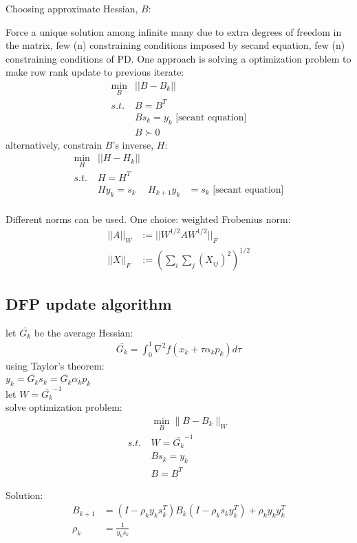\documentclass[8pt,letter]{article}
\begin{document}
\begin{multicols*}{2}
  Choosing approximate Hessian, $B$:
  
  Force a unique solution among infinite many due to extra degrees of freedom in the matrix, few (n) constraining conditions imposed by secand equation, few (n) constraining conditions of PD. One approach is solving a optimization problem to make row rank update to previous iterate:
  \begin{align*}
    \min_B & ||B-B_k||\\
    s.t.\ &B=B^T \\
    &Bs_k=y_k \text{ [secant equation]}\\
    &B \succ 0
  \end{align*}
  alternatively, constrain $B$'s inverse, $H$:
  \begin{align*}
    \min_H & ||H-H_k||\\
    s.t.\ &H=H^T\\
    &Hy_k=s_k
    &H_{k+1}y_k & = s_k \text{ [secant equation]}\\
  \end{align*}
  
  Different norms can be used. One choice: weighted Frobenius norm:
  \begin{align*}
    ||A||_W & := ||W^{1/2}AW^{1/2}||_F\\
    ||X||_F & := (\sum_i \sum_j (X_{ij})^2)^{1/2}
  \end{align*}

  \subsection{DFP update algorithm}
  let $\bar{G_k}$ be the average Hessian:
  \begin{align*}
    \bar{G_k} = \int_0^1 \nabla^2 f(x_k + \tau \alpha_k p_k) d \tau
  \end{align*}
  using Taylor's theorem:\\
  $y_k = \bar{G_k} s_k = \bar{G_k} \alpha_k p_k$\\
  let $W=\bar{G_k}^{-1}$\\
  solve optimization problem:
  \begin{align*}
    &\min_B \| B - B_k \|_W\\
    s.t.\ &W=\bar{G_k}^{-1}\\
    &Bs_k=y_k\\
    &B=B^T
  \end{align*}
  
  Solution:
  \begin{align*}
    B_{k+1} &= (I-\rho_k y_k s_k^T)B_k(I - \rho_k s_k y_k^T) + \rho_k y_k y_k^T\\
    \rho_k &= \frac{1}{y_k s_k}
  \end{align*}


\end{multicols*}
\end{document}
